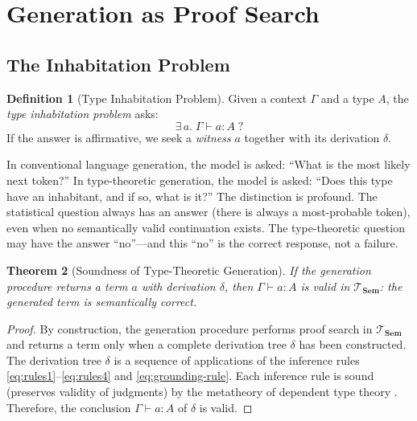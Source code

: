 \documentclass[11pt,a4paper]{article}
\theoremstyle{plain}
\newtheorem{theorem}{Theorem}[section]
\theoremstyle{definition}
\newtheorem{definition}[theorem]{Definition}
\theoremstyle{remark}
\newcommand{\Sem}{\mathbf{Sem}}
\begin{document}
\section{Generation as Proof Search}\label{sec:proof-search}

\subsection{The Inhabitation Problem}

\begin{definition}[Type Inhabitation Problem]\label{def:inhabitation}
Given a context $\Gamma$ and a type $A$, the \emph{type inhabitation problem} asks:
\[
  \exists\, a.\; \Gamma \vdash a : A \;?
\]
If the answer is affirmative, we seek a \emph{witness} $a$ together with its derivation $\delta$.
\end{definition}

In conventional language generation, the model is asked: ``What is the most likely next token?''
In type-theoretic generation, the model is asked: ``Does this type have an inhabitant, and if so, what is it?''
The distinction is profound.
The statistical question always has an answer (there is always a most-probable token), even when no semantically valid continuation exists.
The type-theoretic question may have the answer ``no''---and this ``no'' is the correct response, not a failure.

\begin{theorem}[Soundness of Type-Theoretic Generation]\label{thm:soundness}
If the generation procedure returns a term $a$ with derivation $\delta$, then $\Gamma \vdash a : A$ is valid in $\mathcal{T}_{\Sem}$: the generated term is semantically correct.
\end{theorem}

\begin{proof}
By construction, the generation procedure performs proof search in $\mathcal{T}_{\Sem}$ and returns a term only when a complete derivation tree $\delta$ has been constructed.
The derivation tree $\delta$ is a sequence of applications of the inference rules \eqref{eq:rules1}--\eqref{eq:rules4} and \eqref{eq:grounding-rule}.
Each inference rule is sound (preserves validity of judgments) by the metatheory of dependent type theory \cite{martinlof1984}.
Therefore, the conclusion $\Gamma \vdash a : A$ of $\delta$ is valid.
\end{proof}
\end{document}
